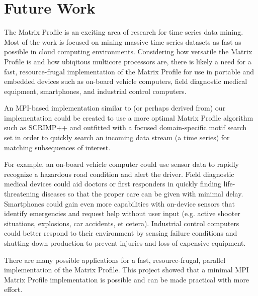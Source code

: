 \documentclass[conference]{IEEEtran}
\begin{document}
\section{Future Work}
The Matrix Profile is an exciting area of research for time series data mining.  Most of the work is focused on mining massive time series datasets as fast as possible in cloud computing environments.  Considering how versatile the Matrix Profile is and how ubiqitous multicore processors are, there is likely a need for a fast, resource-frugal implementation of the Matrix Profile for use in portable and embedded devices such as on-board vehicle computers, field diagnostic medical equipment, smartphones, and industrial control computers.  

An MPI-based implementation similar to (or perhaps derived from) our implementation could be created to use a more optimal Matrix Profile algorithm such as SCRIMP++ and outfitted with a focused domain-specific motif search set in order to quickly search an incoming data stream (a time series) for matching subsequences of interest.  

For example, an on-board vehicle computer could use sensor data to rapidly recognize a hazardous road condition and alert the driver.  Field diagnostic medical devices could aid doctors or first responders in quickly finding life-threatening diseases so that the proper care can be given with minimal delay.  Smartphones could gain even more capabilities with on-device sensors that identify emergencies and request help without user input (e.g. active shooter situations, explosions, car accidents, et cetera).  Industrial control computers could better respond to their environment by sensing failure conditions and shutting down production to prevent injuries and loss of expensive equipment.  

There are many possible applications for a fast, resource-frugal, parallel implementation of the Matrix Profile.  This project showed that a minimal MPI Matrix Profile implementation is possible and can be made practical with more effort.


\end{document}
